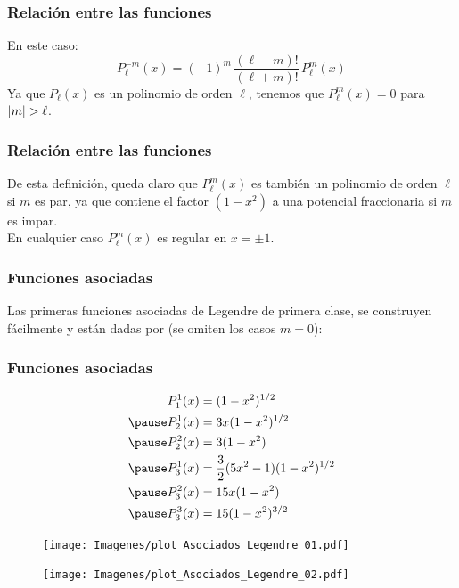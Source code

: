 \documentclass[12pt]{beamer}
\begin{document}
\begin{frame}
\frametitle{Relación entre las funciones}
En este caso:
\pause
\begin{equation}
P_{\ell}^{-m} (x) = (-1)^{m} \, \dfrac{(\ell - m)!}{(\ell + m)!} \, P_{\ell}^{m} (x)
\label{eq:ecuacion_18_33}
\end{equation}
Ya que $P_{\ell}(x)$ es un polinomio de orden $\ell$, tenemos que $P_{\ell}^{m}(x) = 0$ para $\abs{m} > \ell$.
\end{frame}
\begin{frame}
\frametitle{Relación entre las funciones}
De esta definición, queda claro que $P_{\ell}^{m} (x)$ es también un polinomio de orden $\ell$ si $m$ es par, ya que contiene el factor $(1-x^{2})$ a una potencial fraccionaria si $m$ es impar.
\\
\bigskip
\pause
En cualquier caso $P_{\ell}^{m}(x)$ es regular en $x = \pm 1$.
\end{frame}
\begin{frame}
\frametitle{Funciones asociadas}
Las primeras funciones asociadas de Legendre de primera clase, se construyen fácilmente y están dadas por (se omiten los casos $m = 0$):
\end{frame}
\begin{frame}
\frametitle{Funciones asociadas}
\begin{eqnarray*}
\begin{aligned}
P_{1}^{1} (x) &= (1-x^{2})^{1/2} \\ \pause
P_{2}^{1} (x) &= 3x (1-x^{2})^{1/2}  \\ \pause
P_{2}^{2} (x) &= 3(1-x^{2})  \\ \pause
P_{3}^{1} (x) &= \frac{3}{2}(5x^{2}-1)(1-x^{2})^{1/2} \\ \pause
P_{3}^{2} (x) &= 15x (1-x^{2}) \\ \pause
P_{3}^{3} (x) &= 15 (1-x^{2})^{3/2} 
\end{aligned}
\end{eqnarray*}
\end{frame}
\begin{frame}[plain]
\begin{figure}
    \centering
    \texttt{[image: Imagenes/plot\_Asociados\_Legendre\_01.pdf]}
\end{figure}
\end{frame}
\begin{frame}[plain]
\begin{figure}
    \centering
    \texttt{[image: Imagenes/plot\_Asociados\_Legendre\_02.pdf]}
\end{figure}
\end{frame}
\end{document}

